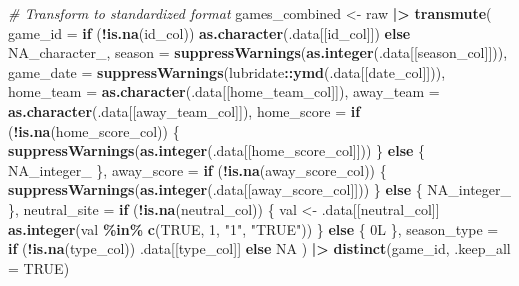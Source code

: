 \documentclass[
]{article}
\newenvironment{Shaded}{\begin{snugshade}}{\end{snugshade}}
\newcommand{\AttributeTok}[1]{\textcolor[rgb]{0.13,0.29,0.53}{#1}}
\newcommand{\CommentTok}[1]{\textcolor[rgb]{0.56,0.35,0.01}{\textit{#1}}}
\newcommand{\ConstantTok}[1]{\textcolor[rgb]{0.56,0.35,0.01}{#1}}
\newcommand{\ControlFlowTok}[1]{\textcolor[rgb]{0.13,0.29,0.53}{\textbf{#1}}}
\newcommand{\DataTypeTok}[1]{\textcolor[rgb]{0.13,0.29,0.53}{#1}}
\newcommand{\DecValTok}[1]{\textcolor[rgb]{0.00,0.00,0.81}{#1}}
\newcommand{\FunctionTok}[1]{\textcolor[rgb]{0.13,0.29,0.53}{\textbf{#1}}}
\newcommand{\NormalTok}[1]{#1}
\newcommand{\OtherTok}[1]{\textcolor[rgb]{0.56,0.35,0.01}{#1}}
\newcommand{\SpecialCharTok}[1]{\textcolor[rgb]{0.81,0.36,0.00}{\textbf{#1}}}
\newcommand{\StringTok}[1]{\textcolor[rgb]{0.31,0.60,0.02}{#1}}
\begin{document}
\begin{Shaded}
\begin{Highlighting}[]
\CommentTok{\# Transform to standardized format}
\NormalTok{games\_combined }\OtherTok{\textless{}{-}}\NormalTok{ raw }\SpecialCharTok{|\textgreater{}}
    \FunctionTok{transmute}\NormalTok{(}
        \AttributeTok{game\_id =} \ControlFlowTok{if}\NormalTok{ (}\SpecialCharTok{!}\FunctionTok{is.na}\NormalTok{(id\_col)) }\FunctionTok{as.character}\NormalTok{(.data[[id\_col]]) }\ControlFlowTok{else} \ConstantTok{NA\_character\_}\NormalTok{,}
        \AttributeTok{season =} \FunctionTok{suppressWarnings}\NormalTok{(}\FunctionTok{as.integer}\NormalTok{(.data[[season\_col]])),}
        \AttributeTok{game\_date =} \FunctionTok{suppressWarnings}\NormalTok{(lubridate}\SpecialCharTok{::}\FunctionTok{ymd}\NormalTok{(.data[[date\_col]])),}
        \AttributeTok{home\_team =} \FunctionTok{as.character}\NormalTok{(.data[[home\_team\_col]]),}
        \AttributeTok{away\_team =} \FunctionTok{as.character}\NormalTok{(.data[[away\_team\_col]]),}
        \AttributeTok{home\_score =} \ControlFlowTok{if}\NormalTok{ (}\SpecialCharTok{!}\FunctionTok{is.na}\NormalTok{(home\_score\_col)) \{}
            \FunctionTok{suppressWarnings}\NormalTok{(}\FunctionTok{as.integer}\NormalTok{(.data[[home\_score\_col]]))}
\NormalTok{        \} }\ControlFlowTok{else}\NormalTok{ \{}
            \ConstantTok{NA\_integer\_}
\NormalTok{        \},}
        \AttributeTok{away\_score =} \ControlFlowTok{if}\NormalTok{ (}\SpecialCharTok{!}\FunctionTok{is.na}\NormalTok{(away\_score\_col)) \{}
            \FunctionTok{suppressWarnings}\NormalTok{(}\FunctionTok{as.integer}\NormalTok{(.data[[away\_score\_col]]))}
\NormalTok{        \} }\ControlFlowTok{else}\NormalTok{ \{}
            \ConstantTok{NA\_integer\_}
\NormalTok{        \},}
        \AttributeTok{neutral\_site =} \ControlFlowTok{if}\NormalTok{ (}\SpecialCharTok{!}\FunctionTok{is.na}\NormalTok{(neutral\_col)) \{}
\NormalTok{            val }\OtherTok{\textless{}{-}}\NormalTok{ .data[[neutral\_col]]}
            \FunctionTok{as.integer}\NormalTok{(val }\SpecialCharTok{\%in\%} \FunctionTok{c}\NormalTok{(}\ConstantTok{TRUE}\NormalTok{, }\DecValTok{1}\NormalTok{, }\StringTok{"1"}\NormalTok{, }\StringTok{"TRUE"}\NormalTok{))}
\NormalTok{        \} }\ControlFlowTok{else}\NormalTok{ \{}
            \DecValTok{0}\DataTypeTok{L}
\NormalTok{        \},}
        \AttributeTok{season\_type =} \ControlFlowTok{if}\NormalTok{ (}\SpecialCharTok{!}\FunctionTok{is.na}\NormalTok{(type\_col)) .data[[type\_col]] }\ControlFlowTok{else} \ConstantTok{NA}
\NormalTok{    ) }\SpecialCharTok{|\textgreater{}}
    \FunctionTok{distinct}\NormalTok{(game\_id, }\AttributeTok{.keep\_all =} \ConstantTok{TRUE}\NormalTok{)}
\end{Highlighting}
\end{Shaded}
\end{document}
